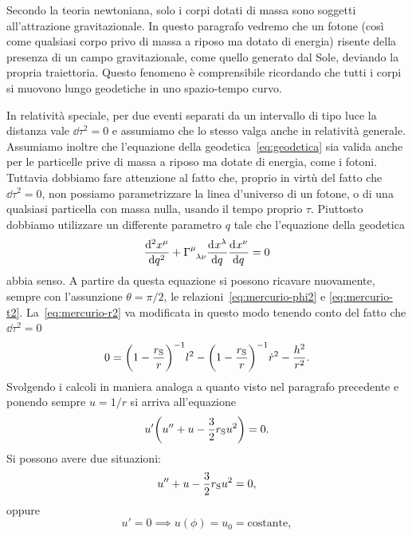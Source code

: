 Secondo la teoria newtoniana, solo i corpi dotati di massa sono soggetti
all'attrazione gravitazionale.  In questo paragrafo vedremo che un fotone (così
come qualsiasi corpo privo di massa a riposo ma dotato di energia) risente della
presenza di un campo gravitazionale, come quello generato dal Sole, deviando la
propria traiettoria.  Questo fenomeno è comprensibile ricordando che tutti i
corpi si muovono lungo geodetiche in uno spazio-tempo curvo.

In relatività speciale, per due eventi separati da un intervallo di tipo luce la
distanza vale $\dd\tau^{2} = 0$ e assumiamo che lo stesso valga anche in
relatività generale.  Assumiamo inoltre che l'equazione della
geodetica~\eqref{eq:geodetica} sia valida anche per le particelle prive di massa
a riposo ma dotate di energia, come i fotoni.  Tuttavia dobbiamo fare attenzione
al fatto che, proprio in virtù del fatto che $\dd\tau^{2} = 0$, non possiamo
parametrizzare la linea d'universo di un fotone, o di una qualsiasi particella
con massa nulla, usando il tempo proprio $\tau$.  Piuttosto dobbiamo utilizzare
un differente parametro $q$ tale che l'equazione della geodetica
\begin{equation}
  \toder[2]{x^{\mu}}{q} + \tensor{\Gamma}{^{\mu}_{\lambda\nu}}
  \toder{x^{\lambda}}{q} \toder{x^{\nu}}{q} = 0
\end{equation}
abbia senso.  A partire da questa equazione si possono ricavare nuovamente,
sempre con l'assunzione $\theta = \pi/2$, le relazioni~\eqref{eq:mercurio-phi2}
e \eqref{eq:mercurio-t2}.  La~\eqref{eq:mercurio-r2} va modificata in questo
modo tenendo conto del fatto che $\dd\tau^{2} = 0$
\begin{equation}
  0 = \bigg(1 - \frac{r_{\textup{S}}}{r}\bigg)^{-1}l^{2} - \bigg(1 -
  \frac{r_{\textup{S}}}{r}\bigg)^{-1}\dot{r}^{2} - \frac{h^{2}}{r^{2}}.
\end{equation}
Svolgendo i calcoli in maniera analoga a quanto visto nel paragrafo precedente e
ponendo sempre $u = 1/r$ si arriva all'equazione
\begin{equation}
  u'\bigg(u'' + u - \frac{3}{2}r_{\textup{S}}u^{2}\bigg) = 0.
\end{equation}
Si possono avere due situazioni:
\begin{equation}
  \label{eq:deflessione1}
  u'' + u - \frac{3}{2}r_{\textup{S}}u^{2} = 0,
\end{equation}
oppure
\begin{equation}
  u' = 0 \implies u(\phi) = u_{0} = \text{costante},
\end{equation}
